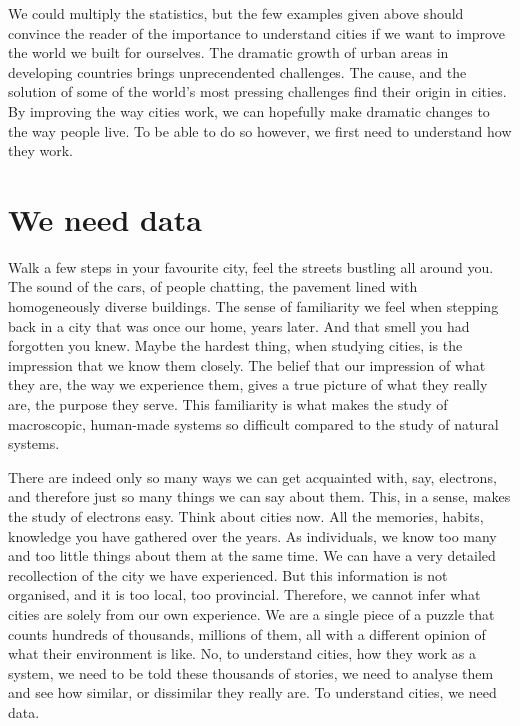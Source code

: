 We could multiply the statistics, but the few examples given above should
convince the reader of the importance to understand cities if we want to
improve the world we built for ourselves. The dramatic growth of urban areas in
developing countries brings unprecendented challenges. The cause, and the
solution of some of the world's most pressing challenges find their origin in
cities. By improving the way cities work, we can hopefully make dramatic changes
to the way people live. To be able to do so however, we first need to understand
how they work.



\section{We need data}
\label{sub:we_need_data}

Walk a few steps in your favourite city, feel the streets bustling all around
you. The sound of the cars, of people chatting, the pavement lined with
 homogeneously diverse buildings. The sense of familiarity we feel when stepping
back in a city that was once our home, years later. And that smell you had
forgotten you knew. Maybe the hardest thing, when studying cities, is the
impression that we know them closely. The belief that our impression of what
they are, the way we experience them, gives a true picture of what they really
are, the purpose they serve. This familiarity is what makes the study of
macroscopic, human-made systems so difficult compared to the study of natural
systems. 

There are indeed only so many ways we can get acquainted with, say, electrons, and
therefore just so many things we can say about them. This, in a sense, makes the
study of electrons easy. Think about cities now. All the memories, habits,
knowledge you have gathered over the years. As individuals, we know too many and
too little things about them at the same time. We can have a very detailed
recollection of the city we have experienced. But this information is not
organised, and it is too local, too provincial. Therefore, we cannot infer what
cities are solely from our own experience.  We are a single piece of a puzzle
that counts hundreds of thousands, millions of them, all with a different
opinion of what their environment is like. No, to understand cities, how they
work as a system, we need to be told these thousands of stories, we need to
analyse them and see how similar, or dissimilar they really are. To understand
cities, we need data.\\




